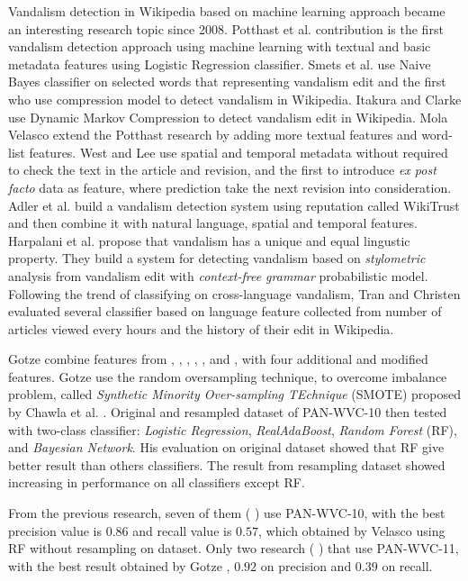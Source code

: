 Vandalism detection in Wikipedia based on machine learning approach
became an interesting research topic since 2008.
Potthast et al. \cite{potthast2008automatic} contribution is the first vandalism
detection approach using machine learning with textual and basic
metadata features using Logistic Regression classifier.
Smets et al. \cite{smets08automaticvandalism} use Naive Bayes classifier on
selected words that representing vandalism edit and the first who use
compression model to detect vandalism in Wikipedia.
Itakura and Clarke \cite{itakura2009using} use Dynamic Markov Compression to
detect vandalism edit in Wikipedia.
Mola Velasco \cite{mola2012wikipedia} extend the Potthast research by adding
more textual features and word-list features.
West and Lee \cite{west2011multilingual} use spatial and temporal metadata
without required to check the text in the article and revision, and the first
to introduce \textit{ex post facto} data as feature, where prediction
take the next revision into consideration.
Adler et al. \cite{adler2011wikipedia} build a vandalism detection system using
reputation called WikiTrust and then combine it with
natural language, spatial and temporal features.
Harpalani et al. \cite{harpalani2011language} propose that vandalism has
a unique and equal lingustic property.
They build a system for detecting vandalism based on \textit{stylometric}
analysis from vandalism edit with \textit{context-free grammar} probabilistic
model.
Following the trend of classifying on cross-language vandalism, Tran and
Christen \cite{tran2013cross} evaluated several classifier based on
language feature collected from number of articles viewed every hours and the
history of their edit in Wikipedia.

Gotze \cite{gotze2014advanced} combine features from
\cite{potthast2008automatic},
\cite{mola2012wikipedia},
\cite{west2011multilingual},
\cite{adler2011wikipedia},
\cite{javanmardi2011vandalism},
and
\cite{wang2010got},
with four additional and modified features.
Gotze use the random oversampling technique, to overcome imbalance problem,
called
\textit{Synthetic Minority Over-sampling TEchnique} (SMOTE)
proposed by Chawla et al.
\cite{chawla2002smote}.
Original and resampled dataset of PAN-WVC-10 then tested with two-class
classifier:
\textit{Logistic Regression},
\textit{RealAdaBoost},
\textit{Random Forest} (RF), and
\textit{Bayesian Network}.
His evaluation on original dataset showed that RF give better result than
others classifiers.
The result from resampling dataset showed increasing in performance on all
classifiers except RF.

From the previous research, seven of them
(\cite{mola2012wikipedia}
\cite{west2011multilingual}
\cite{adler2011wikipedia}
\cite{harpalani2011language}
\cite{gotze2014advanced}
\cite{wang2010got}
\cite{adler2010detecting}
)
use PAN-WVC-10, with the best precision value is $0.86$ and recall value is
$0.57$, which obtained by Velasco \cite{mola2012wikipedia} using RF without
resampling on dataset.
Only two research
(\cite{west2011multilingual}\cite{gotze2014advanced}
)
that use PAN-WVC-11,
with the best result obtained by Gotze \cite{gotze2014advanced}, $0.92$ on
precision and $0.39$ on recall.
